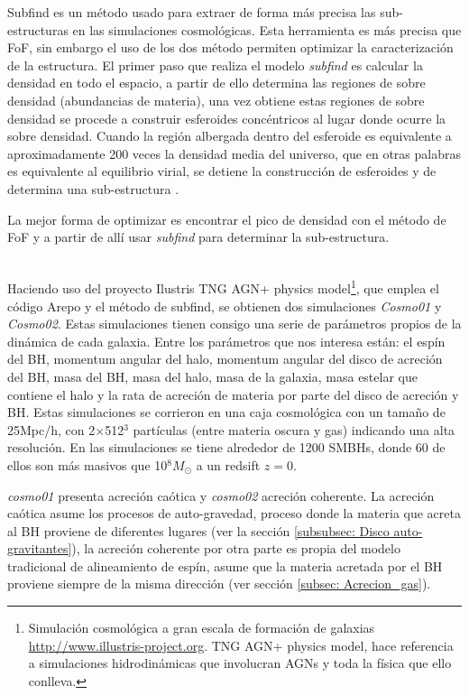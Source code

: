 Subfind es un método usado para extraer de forma más precisa las sub-estructuras en las simulaciones cosmológicas. Esta herramienta es más precisa que FoF, sin embargo el uso de los dos método permiten optimizar la caracterización de la estructura. El primer paso que realiza el modelo {\it{subfind}} es calcular la densidad en todo el espacio, a partir de ello determina las regiones de sobre densidad (abundancias de materia), una vez  obtiene estas regiones de sobre densidad se procede a construir esferoides concéntricos al lugar donde ocurre la sobre densidad. Cuando la región albergada dentro del esferoide es equivalente a aproximadamente 200 veces la densidad media del universo, que en otras palabras es equivalente al equilibrio virial, se detiene la construcción de esferoides y de determina una sub-estructura \cite{springel2018}.

La mejor forma de optimizar es encontrar el pico de densidad con el método de FoF y a partir de allí usar {\it{subfind}} para determinar la sub-estructura.

~\\

Haciendo uso del proyecto Ilustris TNG AGN+ physics model\footnote{Simulación cosmológica a gran escala de formación de galaxias \url{http://www.illustris-project.org}. TNG AGN+ physics model, hace referencia a simulaciones hidrodinámicas que involucran AGNs y toda la física que ello conlleva.}, que emplea el código Arepo y el método de subfind, se obtienen dos simulaciones {\it{Cosmo01}} y {\it{Cosmo02}}. Estas simulaciones tienen consigo una serie de parámetros propios de la dinámica de cada galaxia. Entre los parámetros que nos interesa están: el espín del BH, momentum angular del halo, momentum angular del disco de acreción del BH, masa del BH, masa del halo, masa de la galaxia, masa estelar que contiene el halo y la rata de acreción de materia por parte del disco de acreción y BH. Estas simulaciones se corrieron en una caja cosmológica con un tamaño de 25Mpc/h, con 2$\times$512$^{3}$ partículas (entre materia oscura y gas) indicando una alta resolución. En las simulaciones se tiene alrededor de 1200 SMBHs, donde 60 de ellos son más masivos que 10$^{8}M_{\odot}$ a un redsift $z=0$.

{\it{cosmo01}} presenta acreción caótica y {\it{cosmo02}} acreción coherente. La acreción caótica asume los procesos de auto-gravedad, proceso donde la materia que acreta al BH proviene de diferentes lugares (ver la sección \ref{subsubsec: Disco auto-gravitantes}), la acreción coherente por otra parte es propia del modelo tradicional de alineamiento de espín, asume que la materia acretada por el BH proviene siempre de la misma dirección (ver sección \ref{subsec: Acrecion_gas}).











